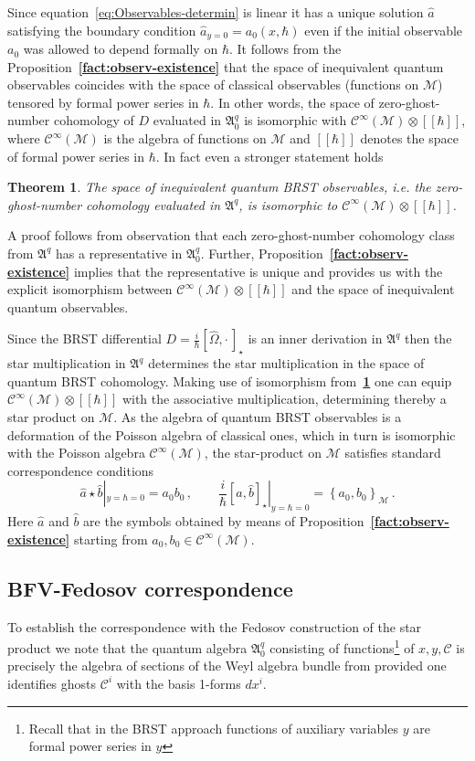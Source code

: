 \documentclass[a4paper,11pt,oneside]{amsart}
\theoremstyle{plain}
\newtheorem{thm}{Theorem}[section]
\numberwithin{equation}{section} %
\numberwithin{figure}{section} %
\newcommand{\bref}[1]{{\bf \ref{#1}}}
\newcommand{\qcommut}[2]{[#1,#2]_\star}
\newcommand{\pb}[2]{\left\{{}#1{},{}#2{}\right\}}
\newcommand{\func}[1]{{{\mathcal C}^\infty}{(#1)}}             %
\def\tensor{\otimes}
\def\cc{{\mathcal C}}
\def\manM{{\mathcal M}}
\def\aA{{ \mathfrak A}}
\begin{document}
\noindent
Since equation~\eqref{eq:Observables-determin} is linear
it has a unique solution $\hat a$ satisfying the
boundary condition ${\hat a}_{y=0}=a_0(x,\hbar)$
even if the initial observable $a_0$ was allowed
to depend formally on $\hbar$.  It follows from
the Proposition~\bref{fact:observ-existence}
that the space of inequivalent quantum observables coincides
with the space of classical observables (functions on $\manM$)
tensored by formal power series in $\hbar$.  In other words, the
space of zero-ghost-number cohomology
of $D$ evaluated in $\aA^q_0$ is isomorphic with
$\func\manM\tensor [[\hbar]]$, where $\func\manM$ is the
algebra of functions on $\manM$ and $[[\hbar]]$ denotes
the space of formal power series
in $\hbar$.  In fact even a stronger statement holds
\begin{thm}
\label{thm:Q-observables}
The space of inequivalent quantum BRST observables, i.e.
the zero-ghost-number cohomology evaluated in $\aA^q$,
is isomorphic to $\func{\manM} \tensor [[\hbar]]$.
\end{thm}
A proof follows from observation that each zero-ghost-number
cohomology class from $\aA^q$ has a representative
in $\aA^q_0$.  Further, Proposition~\bref{fact:observ-existence}
implies that the representative is unique and provides us
with the explicit isomorphism between $\func\manM \tensor [[\hbar]]$
and the space of inequivalent quantum observables.

\noindent
Since the BRST differential
$D=\frac{i}{\hbar}\qcommut{\hat\Omega}{\cdot\,}$
is an inner derivation in $\aA^q$ then the
star multiplication in $\aA^q$ determines
the star multiplication in the space of
quantum BRST cohomology.  Making use of isomorphism
from~\bref{thm:Q-observables} one can equip
$\func\manM\tensor [[\hbar]]$ with the associative
multiplication, determining thereby a star product on
$\manM$.  As the algebra of quantum BRST observables is
a deformation of the Poisson algebra of
classical ones, which in turn is isomorphic with the
Poisson algebra $\func{\manM}$, the star-product on
$\manM$ satisfies standard correspondence conditions
\begin{equation}
{\hat a}\star {\hat b}|_{y=\hbar=0}=a_0 b_0\,, \qquad
  \frac{i}{\hbar}\qcommut{\hat a}{\hat b}|_{y=\hbar=0}
  =\pb{a_0}{b_0}_{\manM}\,.
\end{equation}
Here $\hat a$ and $\hat b$ are the symbols obtained by means
of Proposition~\bref{fact:observ-existence} starting from
$a_0,b_0\in\func\manM$.


\subsection{BFV-Fedosov correspondence}
To establish the correspondence with the Fedosov construction
of the star product we note that the quantum algebra
$\aA_0^q$ consisting of functions\footnote{Recall that in
the BRST approach functions of auxiliary variables
$y$ are formal power series in $y$} of $x,y,\cc$ is precisely
the algebra of sections of the Weyl algebra bundle from
\cite{[Fedosov-JDG]} provided one identifies ghosts $\cc^i$ with the
basis 1-forms $dx^i$.
\end{document}
